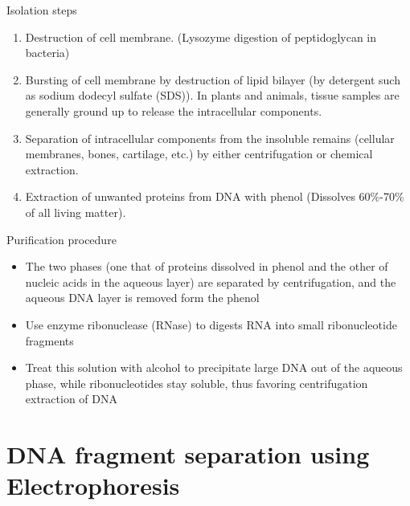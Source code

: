 \documentclass[ignorenonframetext,aspectratio=169]{beamer}
\providecommand{\tightlist}{%
  \setlength{\itemsep}{0pt}\setlength{\parskip}{0pt}}
\begin{document}
\begin{frame}{Isolation steps}
\protect\hypertarget{isolation-steps}{}

\begin{enumerate}
\tightlist
\item
  Destruction of cell membrane. (Lysozyme digestion of peptidoglycan in
  bacteria)
\item
  Bursting of cell membrane by destruction of lipid bilayer (by
  detergent such as sodium dodecyl sulfate (SDS)). In plants and
  animals, tissue samples are generally ground up to release the
  intracellular components.
\item
  Separation of intracellular components from the insoluble remains
  (cellular membranes, bones, cartilage, etc.) by either centrifugation
  or chemical extraction.
\item
  Extraction of unwanted proteins from DNA with phenol (Dissolves
  60\%-70\% of all living matter).
\end{enumerate}

\end{frame}

\begin{frame}{Purification procedure}
\protect\hypertarget{purification-procedure}{}

\begin{itemize}
\tightlist
\item
  The two phases (one that of proteins dissolved in phenol and the other
  of nucleic acids in the aqueous layer) are separated by
  centrifugation, and the aqueous DNA layer is removed form the phenol
\item
  Use enzyme ribonuclease (RNase) to digests RNA into small
  ribonucleotide fragments
\item
  Treat this solution with alcohol to precipitate large DNA out of the
  aqueous phase, while ribonucleotides stay soluble, thus favoring
  centrifugation extraction of DNA
\end{itemize}

\end{frame}

\hypertarget{dna-fragment-separation-using-electrophoresis}{%
\section{DNA fragment separation using
Electrophoresis}\label{dna-fragment-separation-using-electrophoresis}}
\end{document}
